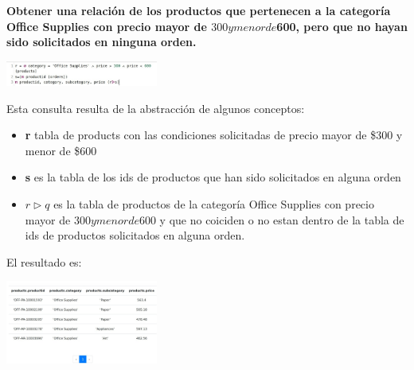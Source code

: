 \textbf{Obtener una relación de los productos que pertenecen a la categoría Office Supplies con precio mayor de $300 y menor de $600, pero que no hayan sido solicitados en ninguna orden.} \vspace{.3cm}

\begin{center}
    \includegraphics[width=5cm]{resources/pregunta2/2.2.1}
\end{center}

Esta consulta resulta de la abstracción de algunos conceptos:
\begin{itemize}
    \item \textbf{r} tabla de products con las condiciones solicitadas de precio mayor de \$300 y menor de \$600
    \item  \textbf{s} es la tabla de los ids de productos que han sido solicitados en alguna orden
    \item  \textbf{$r \vartriangleright q$} es la tabla de productos de la categoría Office Supplies con precio mayor de $300 y menor de $600 y que no coiciden o no estan dentro de la tabla de ids de productos solicitados en alguna orden.
\end{itemize}

El resultado es:

\begin{center}
    \includegraphics[width=5cm]{resources/pregunta2/2.2.2}
\end{center}

